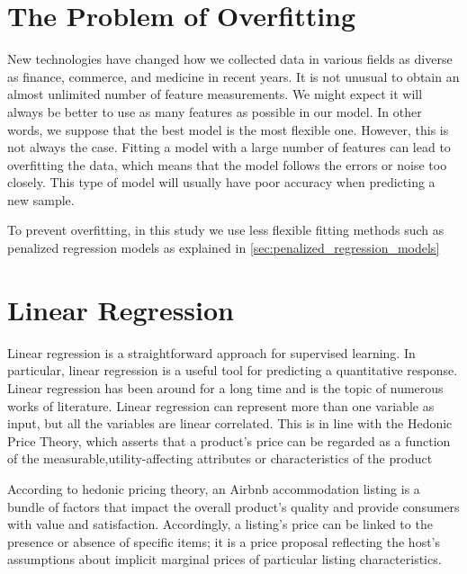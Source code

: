 \section{The Problem of Overfitting}
\label{sec:overfitting}
New technologies have changed how we collected data in various fields as diverse
as finance, commerce, and medicine in recent years.  It is not unusual to obtain
an almost unlimited number of feature measurements. We might expect it will always be better to use as many features as possible in
our model. In other words, we suppose that the best model is the most flexible
one. However, this is not always the case.  Fitting a  model with a large number
of features can lead to overfitting the data, which means that the model follows
the errors or noise too closely.  This type of model will usually have poor
accuracy when predicting a new sample.

To prevent overfitting, in this study we use less flexible fitting methods such
as penalized regression models as explained in
\ref{sec:penalized_regression_models}


\section{Linear Regression}
\label{sec:linear-regression}

Linear regression is a straightforward approach for supervised learning. In
particular, linear regression is a useful tool for predicting a quantitative
response. Linear regression has been around for a long time and is the topic of
numerous works of literature.  Linear regression can represent more than one
variable as input, but all the variables are linear correlated. This is in line
with the Hedonic Price Theory, which asserts that a product's price can be
regarded as a function of the measurable,utility-affecting attributes or
characteristics of the product \parencite{rosen1974hedonic}

According to hedonic pricing theory, an Airbnb accommodation listing is a bundle
of factors that impact the overall product's quality and provide consumers with
value and satisfaction.  Accordingly, a listing's price can be linked to the
presence or absence of specific items; it is a price proposal reflecting the
host's assumptions about implicit marginal prices of particular listing
characteristics.


